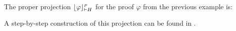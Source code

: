 \begin{example}
\label{example:DProjectionProper}
The proper projection $\projectionProper{\varphi}{\seq H }$ for the proof $\varphi$ from the previous example is:
\begin{scriptsize}
\begin{prooftree}
		 
	 
	 
				 
						 
						 
					 
					 
					 
			 
									 
										 
								  
								 
					  
					 
\end{prooftree}
\end{scriptsize}

\noindent
A step-by-step construction of this projection can be found in \cite{ToDo}.
\hfill\QED
\end{example}

